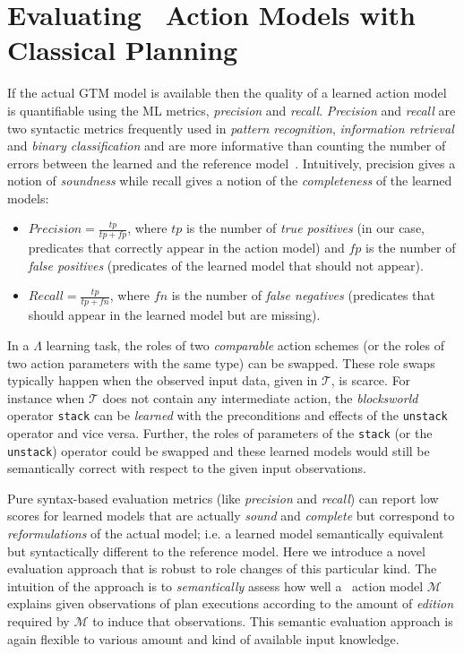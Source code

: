 \section{Evaluating \strips\ Action Models with Classical Planning}
\label{evaluation}

If the actual GTM model is available then the quality of a learned action model is quantifiable using the ML metrics, {\em precision} and {\em recall}. {\em Precision} and {\em recall} are two syntactic metrics frequently used in {\em pattern recognition}, {\em information retrieval} and {\em binary classification} and are more informative than counting the number of errors between the learned and the reference model~\cite{davis2006relationship}. Intuitively, precision gives a notion of {\em soundness} while recall gives a notion of the {\em completeness} of the learned models:
\begin{itemize}
\item $Precision=\frac{tp}{tp+fp}$, where $tp$ is the number of {\em true positives} (in our case, predicates that correctly appear in the action model) and $fp$ is the number of {\em false positives} (predicates of the learned model that should not appear).
\item $Recall=\frac{tp}{tp+fn}$, where $fn$ is the number of {\em false negatives} (predicates that should appear in the learned model but are missing).
\end{itemize}

In a $\Lambda$ learning task, the roles of two {\em comparable} action schemes (or the roles of two action parameters with the same type) can be swapped. These role swaps typically happen when the observed input data, given in $\mathcal{T}$, is scarce. For instance when $\mathcal{T}$ does not contain any intermediate action, the {\em blocksworld} operator {\small\tt stack} can be {\em learned} with the preconditions and effects of the {\small\tt unstack} operator and vice versa. Further, the roles of parameters of the {\small\tt stack} (or the {\small\tt unstack}) operator could be swapped and these learned models would still be semantically correct with respect to the given input observations.

Pure syntax-based evaluation metrics (like {\em precision} and {\em recall}) can report low scores for learned models that are actually {\em sound} and {\em complete} but correspond to {\em reformulations} of the actual model; i.e. a learned model semantically equivalent but syntactically different to the reference model. Here we introduce a novel evaluation approach that is robust to role changes of this particular kind. The intuition of the approach is to {\em semantically} assess how well a \strips\ action model $\mathcal{M}$ explains given observations of plan executions according to the amount of {\em edition} required by $\mathcal{M}$ to induce that observations. This semantic evaluation approach is again flexible to various amount and kind of available input knowledge.

